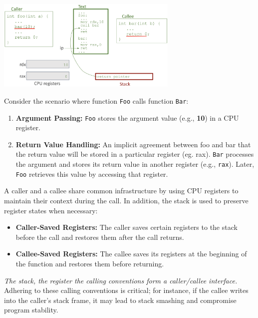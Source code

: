 \documentclass[../../compsys.tex]{subfiles}
\begin{document}
\begin{center}
    \includegraphics[width=0.65\textwidth]{chapters/L4/images/foo-bar.png}
\end{center}
\vspace{10px}
\begin{example}
Consider the scenario where function \texttt{Foo} calls function \texttt{Bar}:
\begin{enumerate}
    \item \textbf{Argument Passing:} \texttt{Foo} stores the argument value (e.g., \textbf{10}) in a CPU register. 
    \item \textbf{Return Value Handling:} An implicit agreement between foo and bar that the return value will be stored in a particular register (eg. rax). \texttt{Bar} processes the argument and stores its return value in another register (e.g., \texttt{rax}). Later, \texttt{Foo} retrieves this value by accessing that register.
\end{enumerate}
\end{example}

A caller and a callee share common infrastructure by using CPU registers to maintain their context during the call. In addition, the stack is used to preserve register states when necessary:
\begin{itemize}
    \item \textbf{Caller-Saved Registers:} The caller saves certain registers to the stack before the call and restores them after the call returns.
    \item \textbf{Callee-Saved Registers:} The callee saves its registers at the beginning of the function and restores them before returning.
\end{itemize}
\textit{The stack, the register the calling conventions form a caller/callee interface.}\\
Adhering to these calling conventions is critical; for instance, if the callee writes into the caller's stack frame, it may lead to stack smashing and compromise program stability.
\end{document}
